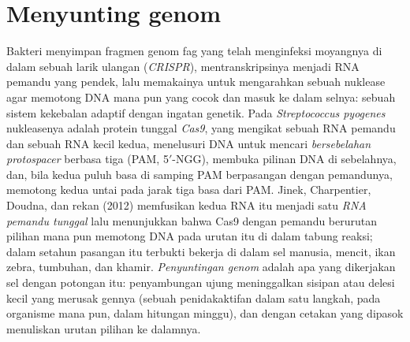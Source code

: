 \section{Menyunting genom}

\begin{definition}\label{def:b3:genetic-engineering:crispr}
Bakteri menyimpan fragmen genom fag yang telah menginfeksi moyangnya di dalam
sebuah larik ulangan (\emph{CRISPR}), mentranskripsinya menjadi RNA pemandu
yang pendek, lalu memakainya untuk mengarahkan sebuah nuklease agar memotong
DNA mana pun yang cocok dan masuk ke dalam selnya: sebuah sistem kekebalan
adaptif dengan ingatan genetik. Pada \emph{Streptococcus pyogenes}
nukleasenya adalah protein tunggal \emph{Cas9}, yang mengikat sebuah RNA
pemandu dan sebuah RNA kecil kedua, menelusuri DNA untuk mencari \emph{
bersebelahan protospacer} berbasa tiga (PAM, 5$'$-NGG), membuka pilinan DNA di
sebelahnya, dan, bila kedua puluh basa di samping PAM berpasangan dengan
pemandunya, memotong kedua untai pada jarak tiga basa dari PAM. Jinek,
Charpentier, Doudna, dan rekan (2012) memfusikan kedua RNA itu menjadi satu
\emph{RNA pemandu tunggal} lalu menunjukkan bahwa Cas9 dengan pemandu berurutan
pilihan mana pun memotong DNA pada urutan itu di dalam tabung reaksi; dalam
setahun pasangan itu terbukti bekerja di dalam sel manusia, mencit, ikan zebra,
tumbuhan, dan khamir. \emph{Penyuntingan genom} adalah apa yang dikerjakan sel
dengan potongan itu: penyambungan ujung meninggalkan sisipan atau delesi kecil
yang merusak gennya (sebuah penidakaktifan dalam satu langkah, pada organisme
mana pun, dalam hitungan minggu), dan  dengan cetakan yang
dipasok menuliskan urutan pilihan ke dalamnya.
\end{definition}

